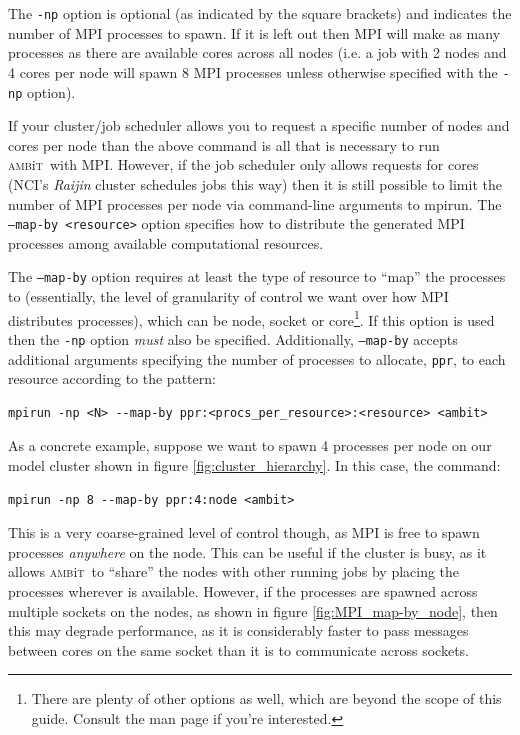 \documentclass{report}
\newcommand{\ambit}{\textsc{amb}{\footnotesize i}\textsc{t}}
\begin{document}
The \texttt{-np} option is optional (as indicated by the square brackets) and indicates the number of MPI
processes to spawn. If it is left out then MPI will make as many processes as there are available cores
across all nodes (i.e. a job with 2 nodes and 4 cores per node will spawn 8 MPI processes unless
otherwise specified with the \texttt{-np} option).

If your cluster/job scheduler allows you to request a specific number of nodes and cores per node
than the above command is all that is necessary to run \ambit\ with MPI. However, if the job scheduler
only allows requests for cores (NCI's \textit{Raijin} cluster schedules jobs this way) then it is still
possible to limit the number of MPI processes per node via command-line arguments to mpirun. The
\texttt{--map-by <resource>} option specifies how to distribute the generated MPI processes among
available computational resources.

The \texttt{--map-by} option requires at least the type of resource to ``map'' the processes to
(essentially, the level of granularity of control we want over how MPI distributes processes), which can
be node, socket or core\footnote{There are plenty of other options as well, which are beyond the
scope of this guide. Consult the man page if you're interested.}. If this option is used then the
\texttt{-np} option \textit{must} also be specified. Additionally, \texttt{--map-by} accepts
additional arguments specifying the number of processes to allocate, \texttt{ppr}, to each resource 
according to the pattern:

\begin{verbatim}
mpirun -np <N> --map-by ppr:<procs_per_resource>:<resource> <ambit>
\end{verbatim}

As a concrete example, suppose we want to spawn 4 processes per node on our model cluster shown in 
figure \ref{fig:cluster_hierarchy}. In this case, the command:

\begin{verbatim}
mpirun -np 8 --map-by ppr:4:node <ambit>
\end{verbatim}

This is a very coarse-grained level of control though, as MPI is free to spawn processes \emph{anywhere} 
on the node. This can be useful if the cluster is busy, as it allows \ambit\ to ``share'' the nodes with
other running jobs by placing the processes wherever is available. However, if the processes are spawned
across multiple sockets on the nodes, as shown in figure \ref{fig:MPI_map-by_node}, then this may degrade
performance, as it is considerably faster to pass messages
between cores on the same socket than it is to communicate across sockets.
\end{document}
